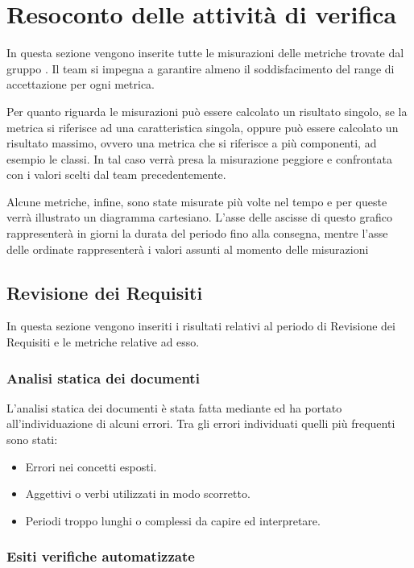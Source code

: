\section{Resoconto delle attività di verifica}

In questa sezione vengono inserite tutte le misurazioni delle metriche trovate dal gruppo \gruppo.
Il team si impegna a garantire almeno il soddisfacimento del range di accettazione per ogni metrica.

Per quanto riguarda le misurazioni può essere calcolato un risultato singolo, se la metrica si riferisce ad una caratteristica singola, oppure può essere calcolato un risultato massimo, ovvero una metrica che si riferisce a più componenti, ad esempio le classi. In tal caso verrà presa la misurazione peggiore e confrontata con i valori scelti dal team precedentemente.

Alcune metriche, infine, sono state misurate più volte nel tempo e per queste verrà illustrato un diagramma cartesiano. L'asse delle ascisse di questo grafico rappresenterà in giorni la durata del periodo fino alla consegna, mentre l'asse delle ordinate rappresenterà i valori assunti al momento delle misurazioni


\subsection{Revisione dei Requisiti}
In questa sezione vengono inseriti i risultati relativi al periodo di Revisione dei Requisiti e le metriche relative ad esso.

\subsubsection{Analisi statica dei documenti}
L'analisi statica dei documenti è stata fatta mediante  ed ha portato all'individuazione di alcuni errori. Tra gli errori individuati quelli più frequenti sono stati:
		\begin{itemize}
			\item Errori nei concetti esposti.
			\item Aggettivi o verbi utilizzati in modo scorretto.
			\item Periodi troppo lunghi o complessi da capire ed interpretare.
		\end{itemize}

\subsubsection{Esiti verifiche automatizzate}
		
